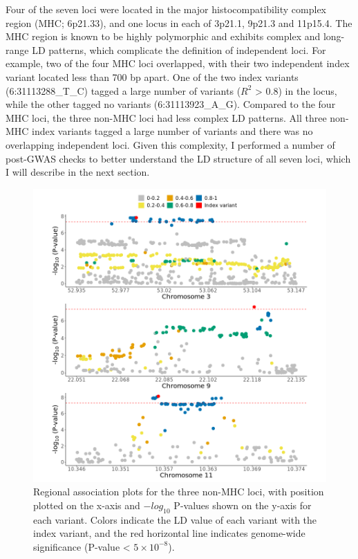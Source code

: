     Four of the seven loci were located in the major histocompatibility complex region (MHC; 6p21.33), and one locus in each of 3p21.1, 9p21.3 and 11p15.4. The MHC region is known to be highly polymorphic and exhibits complex and long-range LD patterns, which complicate the definition of independent loci. 
    For example, two of the four MHC loci overlapped, with their two independent index variant located less than 700 bp apart. One of the two index variants (6:31113288\_T\_C) tagged a large number of variants ($R^{2}$ > 0.8) in the locus, while the other tagged no variants (6:31113923\_A\_G). Compared to the four MHC loci, the three non-MHC loci had less complex LD patterns. All three non-MHC index variants tagged a large number of variants and there was no overlapping independent loci. Given this complexity, I performed a number of post-GWAS checks to better understand the LD structure of all seven loci, which I will describe in the next section.


    \begin{figure}[H] 
      \centering    
      \includegraphics[width=1.0\textwidth]{Vector/ukbb_nonmhc_regional_assoc_plots.png}
      \caption[Figure]{Regional association plots for the three non-MHC loci, with position plotted on the x-axis and $-log_{10}$ P-values shown on the y-axis for each variant. Colors indicate the LD value of each variant with the index variant, and the red horizontal line indicates genome-wide significance (P-value < $5\times10^{-8}$).}
      \label{fig:ukbb_nonmhc_regional_assoc_plots}
      \end{figure}

